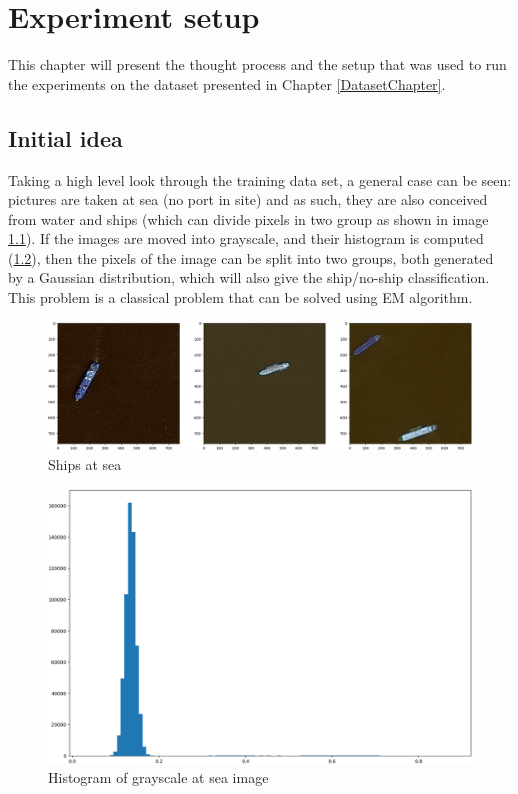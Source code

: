 \chapter{Experiment setup}
\label{ExperimentSetup}

This chapter will present the thought process and the setup that was used to run the experiments on the dataset presented in Chapter \ref{DatasetChapter}.

\section{Initial idea}

Taking a high level look through the training data set, a general case can be seen: pictures are taken at sea (no port in site) and as such, they are also conceived from water and ships (which can divide pixels in two group as shown in image \ref{ShipExampleAtSea}). If the images are moved into grayscale, and their histogram is computed (\ref{ImageHistogram}), then the pixels of the image can be split into two groups, both generated by a Gaussian distribution, which will also give the ship/no-ship classification. This problem is a classical problem that can be solved using EM algorithm.

\begin{figure}[h]
	\centering
	\includegraphics[height=0.2\textheight]{Pictures/002ShipExampleatSea.png}
	\caption{Ships at sea}
	\label{ShipExampleAtSea}
\end{figure}

\begin{figure}[h]
	\centering
	\includegraphics[width=\textwidth]{Pictures/005ImageHistogram.png}
	\caption{Histogram of grayscale at sea image}
	\label{ImageHistogram}
\end{figure}

